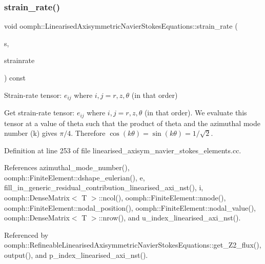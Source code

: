 \subsubsection{\texorpdfstring{strain\+\_\+rate()}{strain\_rate()}}
{\footnotesize\ttfamily void oomph\+::\+Linearised\+Axisymmetric\+Navier\+Stokes\+Equations\+::strain\+\_\+rate (\begin{DoxyParamCaption}\item[{const \hyperlink{classoomph_1_1Vector}{Vector}$<$ double $>$ \&}]{s,  }\item[{\hyperlink{classoomph_1_1DenseMatrix}{Dense\+Matrix}$<$ double $>$ \&}]{strainrate }\end{DoxyParamCaption}) const}



Strain-\/rate tensor\+: $ e_{ij} $ where $ i,j = r,z,\theta $ (in that order) 

Get strain-\/rate tensor\+: $ e_{ij} $ where $ i,j = r,z,\theta $ (in that order). We evaluate this tensor at a value of theta such that the product of theta and the azimuthal mode number (k) gives $ \pi/4 $. Therefore $ \cos(k \theta) = \sin(k \theta) = 1/\sqrt{2} $. 

Definition at line 253 of file linearised\+\_\+axisym\+\_\+navier\+\_\+stokes\+\_\+elements.\+cc.



References azimuthal\+\_\+mode\+\_\+number(), oomph\+::\+Finite\+Element\+::dshape\+\_\+eulerian(), e, fill\+\_\+in\+\_\+generic\+\_\+residual\+\_\+contribution\+\_\+linearised\+\_\+axi\+\_\+nst(), i, oomph\+::\+Dense\+Matrix$<$ T $>$\+::ncol(), oomph\+::\+Finite\+Element\+::nnode(), oomph\+::\+Finite\+Element\+::nodal\+\_\+position(), oomph\+::\+Finite\+Element\+::nodal\+\_\+value(), oomph\+::\+Dense\+Matrix$<$ T $>$\+::nrow(), and u\+\_\+index\+\_\+linearised\+\_\+axi\+\_\+nst().



Referenced by oomph\+::\+Refineable\+Linearised\+Axisymmetric\+Navier\+Stokes\+Equations\+::get\+\_\+\+Z2\+\_\+flux(), output(), and p\+\_\+index\+\_\+linearised\+\_\+axi\+\_\+nst().

\mbox{\label{classoomph_1_1LinearisedAxisymmetricNavierStokesEquations_ac8449bac35c1dc335a4815b3274d6509}} 
